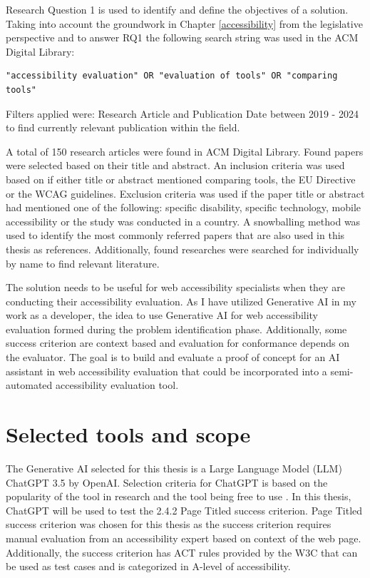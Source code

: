 Research Question 1 is used to identify and define the objectives of a solution. Taking into account the groundwork in Chapter \ref{accessibility} from the legislative perspective and to answer RQ1 the following search string was used in the ACM Digital Library:

\begin{verbatim}
"accessibility evaluation" OR "evaluation of tools" OR "comparing tools"
\end{verbatim}

Filters applied were: Research Article and Publication Date between 2019 - 2024 to find currently relevant publication within the field. 

A total of 150 research articles were found in ACM Digital Library. Found papers were selected based on their title and abstract. An inclusion criteria was used based on if either title or abstract mentioned comparing tools, the EU Directive or the WCAG guidelines. Exclusion criteria was used if the paper title or abstract had mentioned one of the following: specific disability, specific technology, mobile accessibility or the study was conducted in a country. A snowballing method was used to identify the most commonly referred papers that are also used in this thesis as references. Additionally, found researches were searched for individually by name to find relevant literature.

The solution needs to be useful for web accessibility specialists when they are conducting their accessibility evaluation. As I have utilized Generative AI in my work as a developer, the idea to use Generative AI for web accessibility evaluation formed during the problem identification phase. Additionally, some success criterion are context based and evaluation for conformance depends on the evaluator. The goal is to build and evaluate a proof of concept for an AI assistant in web accessibility evaluation that could be incorporated into a semi-automated accessibility evaluation tool.

\section{Selected tools and scope}

The Generative AI selected for this thesis is a Large Language Model (LLM) ChatGPT 3.5 by OpenAI. Selection criteria for ChatGPT is based on the popularity of the tool in research and the tool being free to use \citep{ouyang2023llm, white2023prompt}. In this thesis, ChatGPT will be used to test the 2.4.2 Page Titled success criterion. Page Titled success criterion was chosen for this thesis as the success criterion requires manual evaluation from an accessibility expert based on context of the web page. Additionally, the success criterion has ACT rules provided by the W3C that can be used as test cases and is categorized in A-level of accessibility. 

